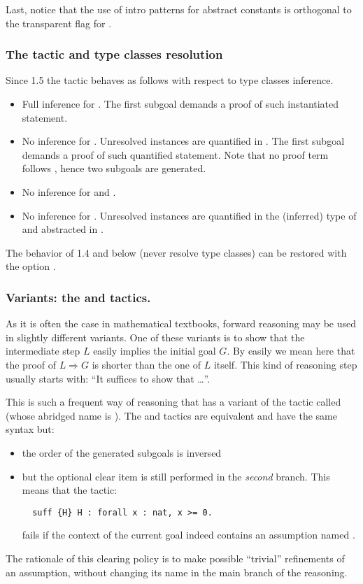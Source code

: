 Last, notice that the use of intro patterns for abstract constants is
orthogonal to the transparent flag  for .

\subsubsection*{The  tactic and type classes resolution}
\label{ssec:havetcresolution}

Since \ssr{} 1.5 the  tactic behaves as follows with respect to type
classes inference.

\begin{itemize}
\item {}
	Full inference for .
	The first subgoal demands a proof of such instantiated statement.
\item {}
	No inference for . Unresolved instances are quantified in
	.  The first subgoal demands a proof of such quantified
	statement.  Note that no proof term follows \C{:=}, hence two
	subgoals are generated.
\item {}
	No inference for  and .
\item {}
	No inference for . Unresolved instances are quantified in the
	(inferred) type of  and abstracted in .
\end{itemize}

The behavior of \ssr{} 1.4 and below (never resolve type classes)
can be restored with the option .

\subsubsection*{Variants: the  and   tactics.}

As it is often the case  in mathematical textbooks, forward
reasoning may be used in slightly different variants.
One of these variants is to show that the intermediate step $L$
easily implies the initial goal $G$. By easily we mean here that
the proof of $L \Rightarrow G$ is shorter than the one of $L$
itself. This kind of reasoning step usually starts with:
``It suffices to show that \dots''.

This is such a frequent way of reasoning that \ssr{} has a variant of the
 tactic called  (whose abridged name is
). The  and  tactics are equivalent and
have the same syntax but:
\begin{itemize}
\item the order of the generated subgoals is inversed
\item but the optional clear item is still performed in the
  \emph{second} branch. This means that the tactic:
\begin{lstlisting}
  suff {H} H : forall x : nat, x >= 0.
\end{lstlisting}
fails if the context of the current goal indeed contains an
assumption named .
\end{itemize}
The rationale of this clearing policy is to make possible ``trivial''
refinements of an assumption, without changing its name in the main
branch of the reasoning.

